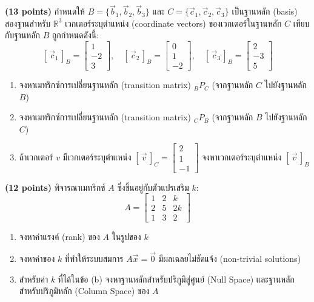 ﻿\documentclass[12pt, a4paper]{exam}
\begin{document}
\begin{questions}
\question \textbf{(13 points)} กำหนดให้ $B = \{\vec{b}_1, \vec{b}_2, \vec{b}_3\}$ และ $C = \{\vec{c}_1, \vec{c}_2, \vec{c}_3\}$ เป็นฐานหลัก (basis) สองฐานสำหรับ $\mathbb{R}^3$ เวกเตอร์ระบุตำแหน่ง (coordinate vectors) ของเวกเตอร์ในฐานหลัก $C$ เทียบกับฐานหลัก $B$ ถูกกำหนดดังนี้:
\[
[\,\vec{c}_1\,]_B = \begin{bmatrix} 1 \\ -2 \\ 3 \end{bmatrix}, \quad
[\,\vec{c}_2\,]_B = \begin{bmatrix} 0 \\ 1 \\ -2 \end{bmatrix}, \quad
[\,\vec{c}_3\,]_B = \begin{bmatrix} 2 \\ -3 \\ 5 \end{bmatrix}
\]
\begin{enumerate}[label=(\alph*)]
    \item จงหาเมทริกซ์การเปลี่ยนฐานหลัก (transition matrix) $_B P_C$ (จากฐานหลัก $C$ ไปยังฐานหลัก $B$)
    \item จงหาเมทริกซ์การเปลี่ยนฐานหลัก (transition matrix) $_C P_B$ (จากฐานหลัก $B$ ไปยังฐานหลัก $C$)
    \item ถ้าเวกเตอร์ $v$ มีเวกเตอร์ระบุตำแหน่ง $[\,\vec{v}\,]_C = \begin{bmatrix} 2 \\ 1 \\ -1 \end{bmatrix}$ จงหาเวกเตอร์ระบุตำแหน่ง $[\,\vec{v}\,]_B$
\end{enumerate}
\newpage

\question \textbf{(12 points)} พิจารณาเมทริกซ์ $A$ ซึ่งขึ้นอยู่กับตัวแปรเสริม $k$:
\[
A = \begin{bmatrix} 1 & 2 & k \\ 2 & 5 & 2k \\ 1 & 3 & 2 \end{bmatrix}
\]
\begin{enumerate}[label=(\alph*)]
    \item จงหาค่าแรงค์ (rank) ของ $A$ ในรูปของ $k$
    \item จงหาค่าของ $k$ ที่ทำให้ระบบสมการ $A\vec{x} = \vec{0}$ มีผลเฉลยไม่ชัดแจ้ง (non-trivial solutions)
    \item สำหรับค่า $k$ ที่ได้ในข้อ (b) จงหาฐานหลักสำหรับปริภูมิสู่ศูนย์ (Null Space) และฐานหลักสำหรับปริภูมิหลัก (Column Space) ของ $A$
\end{enumerate}


\end{questions}
\end{document}
